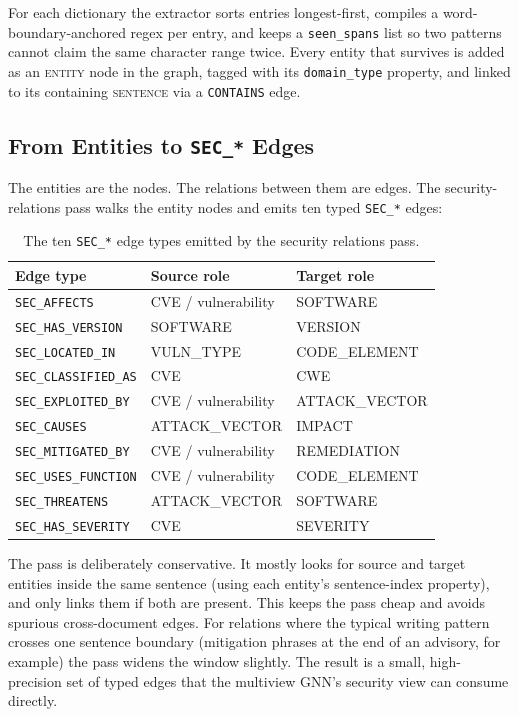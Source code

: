 \documentclass[11pt]{article}
\begin{document}
For each dictionary the extractor sorts entries longest-first,
compiles a word-boundary-anchored regex per entry, and keeps a
\texttt{seen\_spans} list so two patterns cannot claim the same
character range twice. Every entity that survives is added as an
\textsc{entity} node in the graph, tagged with its
\texttt{domain\_type} property, and linked to its containing
\textsc{sentence} via a \texttt{CONTAINS} edge.

\subsection{From Entities to \texttt{SEC\_*} Edges}

The entities are the nodes. The relations between them are edges.
The security-relations pass walks the entity nodes and emits ten
typed \texttt{SEC\_*} edges:

\begin{table}[h]
\centering
\small
\begin{tabular}{lll}
\toprule
Edge type & Source role & Target role \\
\midrule
\texttt{SEC\_AFFECTS}        & CVE / vulnerability    & SOFTWARE \\
\texttt{SEC\_HAS\_VERSION}   & SOFTWARE               & VERSION \\
\texttt{SEC\_LOCATED\_IN}    & VULN\_TYPE             & CODE\_ELEMENT \\
\texttt{SEC\_CLASSIFIED\_AS} & CVE                    & CWE \\
\texttt{SEC\_EXPLOITED\_BY}  & CVE / vulnerability    & ATTACK\_VECTOR \\
\texttt{SEC\_CAUSES}         & ATTACK\_VECTOR         & IMPACT \\
\texttt{SEC\_MITIGATED\_BY}  & CVE / vulnerability    & REMEDIATION \\
\texttt{SEC\_USES\_FUNCTION} & CVE / vulnerability    & CODE\_ELEMENT \\
\texttt{SEC\_THREATENS}      & ATTACK\_VECTOR         & SOFTWARE \\
\texttt{SEC\_HAS\_SEVERITY}  & CVE                    & SEVERITY \\
\bottomrule
\end{tabular}
\caption{The ten \texttt{SEC\_*} edge types emitted by the security
relations pass.}
\end{table}

The pass is deliberately conservative. It mostly looks for source and
target entities inside the same sentence (using each entity's
sentence-index property), and only links them if both are present.
This keeps the pass cheap and avoids spurious cross-document edges.
For relations where the typical writing pattern crosses one sentence
boundary (mitigation phrases at the end of an advisory, for example)
the pass widens the window slightly. The result is a small,
high-precision set of typed edges that the multiview GNN's security
view can consume directly.
\end{document}

